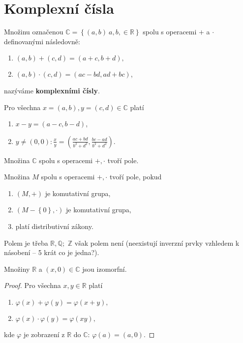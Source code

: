\section{Komplexní čísla}
\begin{definition}\label{kompl_c_def}
Množinu označenou $\mathbb C = \left \{ (a,b)\ a,b, \in \mathbb R \right \} $
spolu s operacemi $+$ a $\cdot$ definovanými následovně:
\begin{enumerate}[$i.$]
\item $(a,b) + (c,d) = (a+c, b+d),$
\item $(a,b) \cdot (c,d) = (ac-bd, ad+bc)$,
\end{enumerate}
nazýváme \textbf{komplexními čísly}.
\end{definition}

\begin{veta}
    Pro všechna $x=(a,b),y=(c,d) \in \mathbb C$ platí
    \begin{enumerate}[$i.$]
    \item $x-y=(a-c, b-d)$,
   	\item $y\ne (0,0): \frac{x}{y}=\left ( \frac{ac+bd}{b^2+d^2}, \frac{bc-ad}{b^2+d^2} \right ) .$
    \end{enumerate}
\end{veta}

\begin{veta}
    Množina $\mathbb C$ spolu s operacemi $+,\cdot$ tvoří pole.
\end{veta}

\begin{pozn}
    Množina $M$ spolu s operacemi $+,\cdot$ tvoří pole, pokud
    \begin{enumerate}[$i.$]
    \item $(M,+)$ je komutativní grupa,
   	\item $(M-\left \{ 0 \right \} ,\cdot)$ je komutativní grupa,
   	\item platí distributivní zákony.
    \end{enumerate}
    Polem je třeba $\mathbb R, \mathbb Q;$ $\mathbb Z$ však polem není (neexistují
    inverzní prvky vzhledem k násobení -- 5 krát co je jedna?).
\end{pozn}

\begin{veta}
    Množiny $\mathbb R$ a $(x,0)\in \mathbb C$ jsou izomorfní.
\end{veta}

\begin{proof}
    Pro všechna $x,y \in \mathbb R$ platí
    \begin{enumerate}[$i.$]
    \item $\varphi(x)+\varphi(y) = \varphi(x+y),$
   	\item $\varphi(x)\cdot\varphi(y) = \varphi(xy),$
    \end{enumerate}
    kde $\varphi$ je zobrazení z $\mathbb R$ do $\mathbb C$: $\varphi(a)=(a,0).$
\end{proof}


